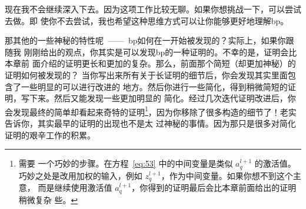 现在我不会继续深入下去。因为这项工作比较无聊。如果你想挑战一下，可以尝试去做。即
使你不去尝试，我也希望这种思维方式可以让你能够更好地理解\gls*{bp}。

那其他的一些神秘的特性呢~——~\gls*{bp}如何在一开始被发现的？实际上，如果你跟随我
刚刚给出的观点，你其实是可以发现\gls*{bp}的一种证明的。不幸的是，证明会比本章前
面介绍的证明更长和更加的复杂。那么，前面那个简短（却更加神秘）的证明如何被发现的？
当你写出来所有关于长证明的细节后，你会发现其实里面包含了一些明显的可以进行改进的
地方。然后你进行一些简化，得到稍微简短的证明，写下来。然后又能发现一些更加明显的
简化。经过几次迭代证明改进后，你会发现最终的简单却看起来奇特的证明\footnote{需要
  一个巧妙的步骤。在方程~\eqref{eq:53} 中的中间变量是类似 $a_q^{l+1}$ 的激活值。
  巧妙之处是改用加权的输入，例如 $z^{l+1}_q$，作为中间变量。如果你想不到这个主意，
  而是继续使用激活值 $a_q^{l+1}$，你得到的证明最后会比本章前面给出的证明稍微复杂
  些。}，因为你移除了很多构造的细节了！老实告诉你，其实最早的证明的出现也不是太
过神秘的事情。因为那只是很多对简化证明的艰辛工作的积累。
